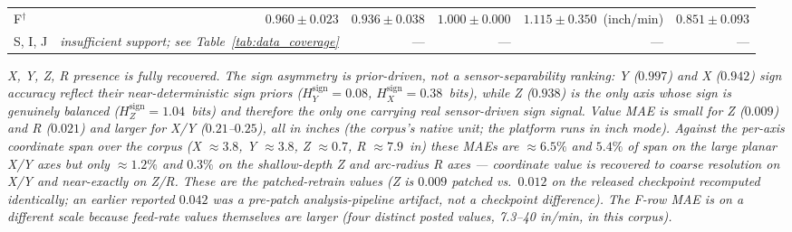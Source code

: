 \begin{table}[H]
{\begin{tabular}{l r r r r r}
F$^{\dagger}$ & $0.960 \pm 0.023$ & $0.936 \pm 0.038$ & $1.000 \pm 0.000$ & $1.115 \pm 0.350$~(inch/min) & $0.851 \pm 0.093$ \\
S, I, J & \emph{insufficient support; see Table~\ref{tab:data_coverage}} & --- & --- & --- & --- \\
\bottomrule
\end{tabular}%
}
\par\smallskip
\footnotesize\textit{X, Y, Z, R presence is fully recovered. The sign asymmetry is prior-driven, not a sensor-separability ranking: Y ($0.997$) and X ($0.942$) sign accuracy reflect their near-deterministic sign priors ($H_{Y}^{\text{sign}}\!=\!0.08$, $H_{X}^{\text{sign}}\!=\!0.38$~bits), while Z ($0.938$) is the only axis whose sign is genuinely balanced ($H_{Z}^{\text{sign}}\!=\!1.04$~bits) and therefore the only one carrying real sensor-driven sign signal. Value MAE is small for Z ($0.009$) and R ($0.021$) and larger for X/Y ($0.21$--$0.25$), all in \emph{inches} (the corpus's native unit; the platform runs in inch mode). Against the per-axis coordinate span over the corpus (X $\approx\!3.8$, Y $\approx\!3.8$, Z $\approx\!0.7$, R $\approx\!7.9$~in) these MAEs are $\approx\!6.5\%$ and $5.4\%$ of span on the large planar X/Y axes but only $\approx\!1.2\%$ and $0.3\%$ on the shallow-depth Z and arc-radius R axes --- coordinate value is recovered to coarse resolution on X/Y and near-exactly on Z/R. These are the patched-retrain values (Z is $0.009$ patched vs.\ $0.012$ on the released checkpoint recomputed identically; an earlier reported $0.042$ was a pre-patch analysis-pipeline artifact, not a checkpoint difference). The F-row MAE is on a different scale because feed-rate values themselves are larger (four distinct posted values, 7.3--40 in/min, in this corpus).}
\end{table}
